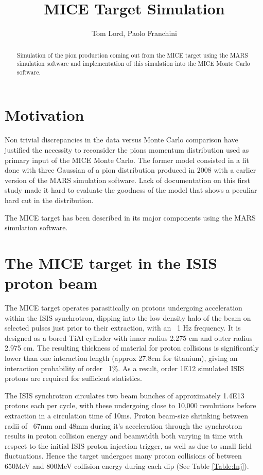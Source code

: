 \documentclass[a4paper,11pt]{article}
\title{MICE Target Simulation}
\author{Tom Lord, Paolo Franchini}
\begin{document}
\maketitle
\tableofcontents

\begin{abstract}
Simulation of the pion production coming out from the MICE target using the MARS simulation software and implementation of this simulation into the MICE Monte Carlo software.
\end{abstract}

\newpage

\section{Motivation}

Non trivial discrepancies in the data versus Monte Carlo comparison have justified the necessity to reconsider the pions momentum distribution used as primary input of the MICE Monte Carlo.
The former model consisted in a fit done with three Gaussian of a pion distribution produced in 2008 with a earlier version of the MARS simulation software. Lack of documentation on this first study made it hard to evaluate the goodness of the model that shows a peculiar hard cut in the distribution.

The MICE target has been described in its major components using the MARS simulation software.
\section{The MICE target in the ISIS proton beam}

The MICE target operates parasitically on protons undergoing acceleration within the ISIS synchrotron, dipping into the low-density halo of the beam on selected pulses just prior to their extraction, with an ~1 Hz frequency. It is designed as a bored TiAl cylinder with inner radius 2.275 cm and outer radius 2.975 cm. The resulting thickness of material for proton collisions is significantly lower than one interaction length (approx 27.8cm for titanium), giving an interaction probability of order ~1\%. As a result, order 1E12 simulated ISIS protons are required for sufficient statistics. 

The ISIS synchrotron circulates two beam bunches of approximately 1.4E13 protons each per cycle, with these undergoing close to 10,000 revolutions before extraction in a circulation time of 10ms. Proton beam-size shrinking between radii of ~67mm and 48mm during it's acceleration through the synchrotron results in proton collision energy and beamwidth both varying in time with respect to the initial ISIS proton injection trigger, as well as due to small field fluctuations. Hence the target undergoes many proton collisions of between 650MeV and 800MeV collision energy during each dip (See Table \ref{Table:Inj}). 
\end{document}
